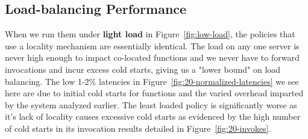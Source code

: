 \subsection{Load-balancing Performance}
\label{sec:policy-comare}








When we run them under \textbf{light load} in Figure~\ref{fig:low-load}, the policies that use a locality mechanism are essentially identical.
The load on any one server is never high enough to impact co-located functions and we never have to forward invocations and incur excess cold starts, giving us a "lower bound" on load balancing.
The low 1-2\% latencies in Figure~\ref{fig:20-normalized-latencies} we see here are due to initial cold starts for functions and the varied overhead imparted by the system analyzed earlier.
The least loaded policy is significantly worse as it's lack of locality causes excessive cold starts as evidenced by the high number of cold starts in its invocation results detailed in Figure~\ref{fig:20-invokes}.


